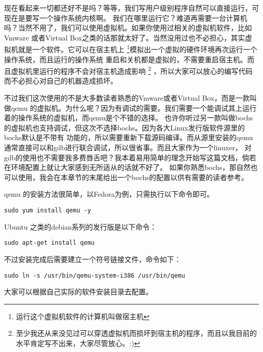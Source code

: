 \par 现在看起来一切都还好不是吗？等等，我们写用户级别程序自然可以直接运行，可现在是要写一个操作系统内核啊。\allowbreak
我们在哪里运行它？难道再需要一台计算机吗？当然不用了，我们可以使用虚拟机。如果你使用过相关的虚拟机软件，比如Vmware\allowbreak
或者Virtual Box之类的话那就太好了。当然没用过也不必担心，其实虚拟机就是一个软件。它可以在宿主机上\allowbreak
\footnote{运行这个虚拟机软件的计算机叫做宿主机}模拟出一个虚拟的硬件环境再次运行一个操作系统，而且运行的操作系统\allowbreak
重启和关机都是虚拟的，不需要重启宿主机。而且虚拟机里运行的程序不会对宿主机造成影响\allowbreak
\footnote{至少我还从来没见过可以穿透虚拟机而损坏到宿主机的程序，而且以我目前的水平肯定写不出来，大家尽管放心。:) }
，所以大家可以放心的编写代码而不必担心对自己的机器造成损坏。

\par 不过我们这次使用的不是大多数读者熟悉的Vmware或者Virtual Box，而是一款叫做qemu\allowbreak
的虚拟机。为什么呢？因为有调试的需要。我们需要一个能调试其上运行着的操作系统的虚拟机，而qemu是个不错的选择。\allowbreak
也许你听过另一款叫做bochs的虚拟机也支持调试，但这次不选择bochs。因为各大Linux发行版软件源里的bochs默认是不带有\allowbreak
功能的，所以需要重新下载源码编译。而从源里安装的qemu通常直接可以和gdb进行联合调试，所以很省事。而且大家作为一个linuxer，\allowbreak
对gdb的使用也不需要我多费唇舌吧？我本着易用简单的理念开始写这篇文档，倘若在环境配置上就让大家感到无所适从的话就不好了。\allowbreak
如果你熟悉bochs，那自然也可以使用，我会在本章节的末尾给出一个bochs的配置以供有需要的读者参考。

qemu 的安装方法很简单，以Fedora为例，只需执行以下命令即可。
\begin{Verbatim}[frame=single]
    sudo yum install qemu -y
\end{Verbatim}

\par Ubuntu 之类的debian系列的发行版是以下命令：
\begin{Verbatim}[frame=single]
    sudo apt-get install qemu
\end{Verbatim}

\par 不过安装完成后需要建立一个符号链接文件，命令如下：

\begin{Verbatim}[frame=single]
    sudo ln -s /usr/bin/qemu-system-i386 /usr/bin/qemu
\end{Verbatim}

\par 大家可以根据自己实际的软件安装目录去配置。

